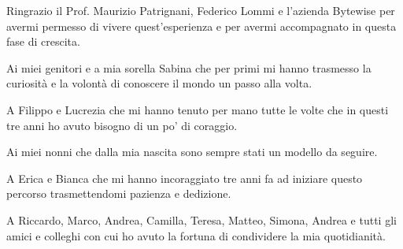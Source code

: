 Ringrazio il Prof. Maurizio Patrignani, Federico Lommi e l'azienda Bytewise per avermi permesso di vivere quest'esperienza e per avermi accompagnato in questa fase di crescita.

Ai miei genitori e a mia sorella Sabina che per primi mi hanno trasmesso la curiosità e la volontà di conoscere il mondo un passo alla volta.

A Filippo e Lucrezia che mi hanno tenuto per mano tutte le volte che in questi tre anni ho avuto bisogno di un po' di coraggio.

Ai miei nonni che dalla mia nascita sono sempre stati un modello da seguire.

A Erica e Bianca che mi hanno incoraggiato tre anni fa ad iniziare questo percorso trasmettendomi pazienza e dedizione.

A Riccardo, Marco, Andrea, Camilla, Teresa, Matteo, Simona, Andrea e tutti gli amici e colleghi con cui ho avuto la fortuna di condividere la mia quotidianità.



